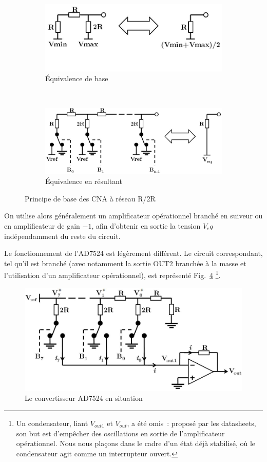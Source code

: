 \documentclass{article}
\begin{document}
\begin{figure}[h]
  \centering
  \begin{subfigure}[b]{0.43\textwidth}
    \centering
    \includegraphics[width=\textwidth]{R2Rbasics}
    \caption{Équivalence de base}
    \label{fig:R2Rbase1}
  \end{subfigure}
  ~~~~
  \begin{subfigure}[b]{0.53\textwidth}
    \centering
    \includegraphics[width=\textwidth]{R2Rexpended}
    \caption{Équivalence en résultant}
    \label{fig:R2Rbase2}
  \end{subfigure}
  \caption{Principe de base des CNA à réseau R/2R}
\end{figure}

On utilise alors généralement un amplificateur opérationnel branché en suiveur ou en amplificateur de gain $-1$, afin d'obtenir en sortie la tension $V_eq$ indépendamment du reste du circuit.


Le fonctionnement de l'AD7524 est légèrement différent. Le circuit correspondant, tel qu'il est branché (avec notamment la sortie OUT2 branchée à la masse et l'utilisation d'un amplificateur opérationnel), est représenté Fig.~\ref{fig:AD7524} \footnote{Un condensateur, liant $V_{out1}$ et $V_{out}$, a été omis~: proposé par les datasheets, son but est d'empêcher des oscillations en sortie de l'amplificateur opérationnel. Nous nous plaçons dans le cadre d'un état déjà stabilisé, où le condensateur agit comme un interrupteur ouvert.}.

\begin{figure}[h]
  \centering
  \includegraphics[width=.6\textwidth]{AD7524}
  \caption{Le convertisseur AD7524 en situation}
  \label{fig:AD7524}
\end{figure}
\end{document}
